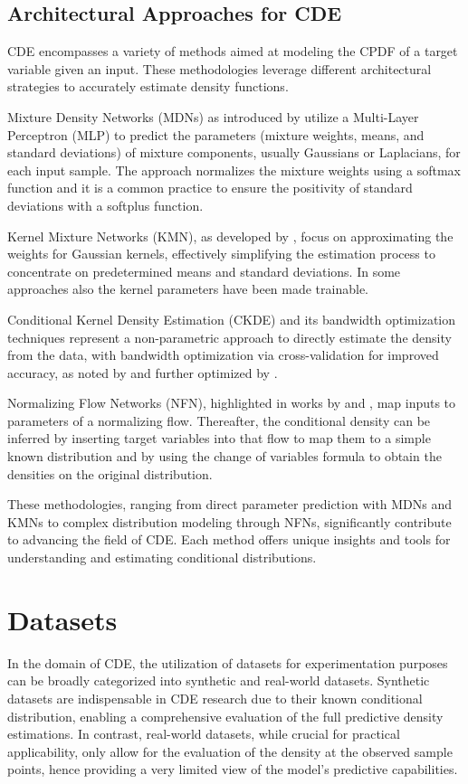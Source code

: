 \documentclass{article}
\begin{document}
\subsection{Architectural Approaches for CDE}

CDE encompasses a variety of methods aimed at modeling the CPDF of a target variable given an input. These methodologies leverage different architectural strategies to accurately estimate density functions.

Mixture Density Networks (MDNs) as introduced by \citep{bishop1994mixture} utilize a Multi-Layer Perceptron (MLP) to predict the parameters (mixture weights, means, and standard deviations) of mixture components, usually Gaussians or Laplacians, for each input sample. The approach normalizes the mixture weights using a softmax function and it is a common practice to ensure the positivity of standard deviations with a softplus function.

Kernel Mixture Networks (KMN), as developed by \citep{ambrogioni2017kernel}, focus on approximating the weights for Gaussian kernels, effectively simplifying the estimation process to concentrate on predetermined means and standard deviations. In some approaches also the kernel parameters have been made trainable.

Conditional Kernel Density Estimation (CKDE) and its bandwidth optimization techniques represent a non-parametric approach to directly estimate the density from the data, with bandwidth optimization via cross-validation for improved accuracy, as noted by \citep{silverman1982estimation} and further optimized by \citep{li2023nonparametric}.

Normalizing Flow Networks (NFN), highlighted in works by \citep{rezende2015variational} and \citep{trippe2018conditional}, map inputs to parameters of a normalizing flow. Thereafter, the conditional density can be inferred by inserting target variables into that flow to map them to a simple known distribution and by using the change of variables formula to obtain the densities on the original distribution.

These methodologies, ranging from direct parameter prediction with MDNs and KMNs to complex distribution modeling through NFNs, significantly contribute to advancing the field of CDE. Each method offers unique insights and tools for understanding and estimating conditional distributions.

\section{Datasets}\label{sec:datasets}
In the domain of CDE, the utilization of datasets for experimentation purposes can be broadly categorized into synthetic and real-world datasets. Synthetic datasets are indispensable in CDE research due to their known conditional distribution, enabling a comprehensive evaluation of the full predictive density estimations. In contrast, real-world datasets, while crucial for practical applicability, only allow for the evaluation of the density at the observed sample points, hence providing a very limited view of the model's predictive capabilities.
\end{document}
